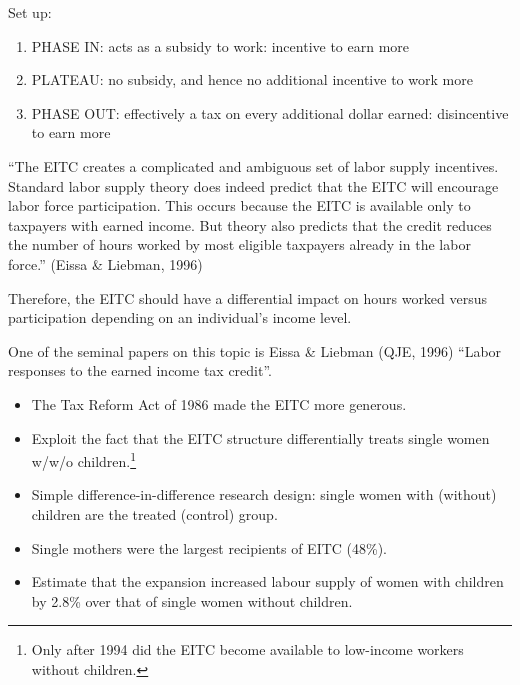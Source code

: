 \documentclass[
  letterpaper,
  DIV=11,
  numbers=noendperiod]{scrreprt}
\theoremstyle{definition}
\theoremstyle{remark}
\begin{document}
Set up:

\begin{enumerate}
\def\labelenumi{\arabic{enumi}.}
\item
  PHASE IN: acts as a subsidy to work: incentive to earn more
\item
  PLATEAU: no subsidy, and hence no additional incentive to work more
\item
  PHASE OUT: effectively a tax on every additional dollar earned:
  disincentive to earn more
\end{enumerate}

\begin{tcolorbox}[enhanced jigsaw, bottomrule=.15mm, coltitle=black, arc=.35mm, left=2mm, opacityback=0, leftrule=.75mm, colbacktitle=quarto-callout-note-color!10!white, title={Note}, toprule=.15mm, bottomtitle=1mm, breakable, colframe=quarto-callout-note-color-frame, opacitybacktitle=0.6, titlerule=0mm, colback=white, rightrule=.15mm, toptitle=1mm]

``The EITC creates a complicated and ambiguous set of labor supply
incentives. Standard labor supply theory does indeed predict that the
EITC will encourage labor force participation. This occurs because the
EITC is available only to taxpayers with earned income. But theory also
predicts that the credit reduces the number of hours worked by most
eligible taxpayers already in the labor force.'' (Eissa \& Liebman,
1996)

\end{tcolorbox}

Therefore, the EITC should have a differential impact on hours worked
versus participation depending on an individual's income level.

One of the seminal papers on this topic is Eissa \& Liebman (QJE, 1996)
``Labor responses to the earned income tax credit''.

\begin{itemize}
\item
  The Tax Reform Act of 1986 made the EITC more generous.
\item
  Exploit the fact that the EITC structure differentially treats single
  women w/w/o children.\footnote{Only after 1994 did the EITC become
    available to low-income workers without children.}
\item
  Simple difference-in-difference research design: single women with
  (without) children are the treated (control) group.
\item
  Single mothers were the largest recipients of EITC (48\%).
\item
  Estimate that the expansion increased labour supply of women with
  children by 2.8\% over that of single women without children.
\end{itemize}
\end{document}
